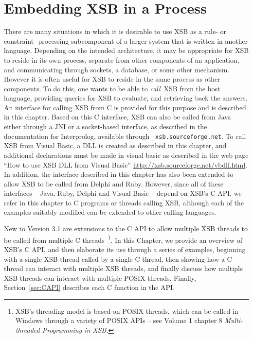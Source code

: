 \chapter{Embedding XSB in a Process}
\label{ccallingxsb}

There are many situations in which it is desirable to use XSB as a
rule- or constraint- processing subcomponent of a larger system that
is written in another language.  Depending on the intended
architecture, it may be appropriate for XSB to reside in its own
process, separate from other components of an application, and
communicating through sockets, a database, or some other mechanism.
However it is often useful for XSB to reside in the same process as
other components.  To do this, one wants to be able to {\em call}\ XSB
from the host language, providing queries for XSB to evaluate, and
retrieving back the answers.  An interface for calling XSB from C is
provided for this purpose and is described in this chapter.  Based on
this C interface, XSB can also be called from Java either through a
JNI or a socket-based interface, as described in the
documentation for Interprolog, available through {\tt
  xsb.sourceforge.net}.  To call XSB from Visual Basic, a DLL is
created as described in this chapter, and additional declarations must
be made in visual basic as described in the web page ``How to use XSB
DLL from Visual Basic'' \url{http://xsb.sourceforge.net/vbdll.html}.
In addition, the interface described in this chapter has also been
extended to allow XSB to be called from Delphi and Ruby.  However,
since all of these interfaces -- Java, Ruby, Delphi and Visual Basic --
depend on XSB's C API, we refer in this chapter to C programs or
threads calling XSB, although each of the examples suitably modified
can be extended to other calling languages.

New to Version 3.1 are extensions to the C API to allow multiple XSB
threads to be called from multiple C threads~\footnote{XSB's threading
  model is based on POSIX threads, which can be called in Windows
  through a variety of POSIX APIs -- see Volume 1 chapter 8 {\em
    Multi-threaded Programming in XSB}.}.  In this Chapter, we provide
an overview of XSB's C API, and then elaborate its use through a
series of examples, beginning with a single XSB thread called by a
single C thread, then showing how a C thread can interact with
multiple XSB threads, and finally discuss how multiple XSB threads can
interact with multiple POSIX threads.  Finally, Section~\ref{sec:CAPI}
describes each C function in the API.

